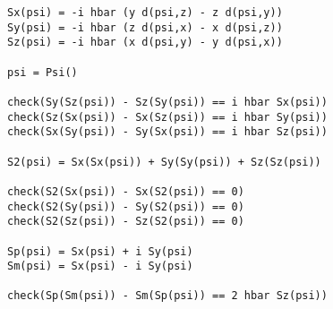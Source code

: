 \newpage
{}

{\footnotesize\begin{verbatim}
Sx(psi) = -i hbar (y d(psi,z) - z d(psi,y))
Sy(psi) = -i hbar (z d(psi,x) - x d(psi,z))
Sz(psi) = -i hbar (x d(psi,y) - y d(psi,x))

psi = Psi()

check(Sy(Sz(psi)) - Sz(Sy(psi)) == i hbar Sx(psi))
check(Sz(Sx(psi)) - Sx(Sz(psi)) == i hbar Sy(psi))
check(Sx(Sy(psi)) - Sy(Sx(psi)) == i hbar Sz(psi))

S2(psi) = Sx(Sx(psi)) + Sy(Sy(psi)) + Sz(Sz(psi))

check(S2(Sx(psi)) - Sx(S2(psi)) == 0)
check(S2(Sy(psi)) - Sy(S2(psi)) == 0)
check(S2(Sz(psi)) - Sz(S2(psi)) == 0)

Sp(psi) = Sx(psi) + i Sy(psi)
Sm(psi) = Sx(psi) - i Sy(psi)

check(Sp(Sm(psi)) - Sm(Sp(psi)) == 2 hbar Sz(psi))
\end{verbatim}}


